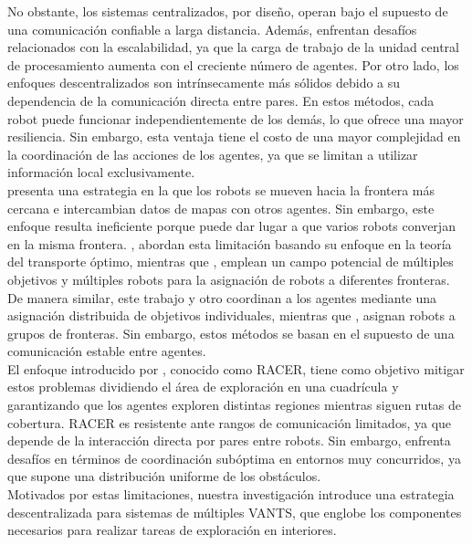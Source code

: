 \documentclass[sigconf]{acmart}
\begin{document}
No obstante, los sistemas centralizados, por diseño, operan bajo el supuesto de una comunicación confiable a larga distancia. Además, enfrentan desafíos relacionados con la escalabilidad, ya que la carga de trabajo de la unidad central de procesamiento aumenta con el creciente número de agentes. Por otro lado, los enfoques descentralizados son intrínsecamente más sólidos debido a su dependencia de la comunicación directa entre pares. En estos métodos, cada robot puede funcionar independientemente de los demás, lo que ofrece una mayor resiliencia. Sin embargo, esta ventaja tiene el costo de una mayor complejidad en la coordinación de las acciones de los agentes, ya que se limitan a utilizar información local exclusivamente.\\

\citeauthor{YAMAUCHI1997} \cite{YAMAUCHI1997} presenta una estrategia en la que los robots se mueven hacia la frontera más cercana e intercambian datos de mapas con otros agentes. Sin embargo, este enfoque resulta ineficiente porque puede dar lugar a que varios robots converjan en la misma frontera. \citeauthor{9483227} \cite{9483227}, abordan esta limitación basando su enfoque en la teoría del transporte óptimo, mientras que \citeauthor{9561328} \cite{9561328}, emplean un campo potencial de múltiples objetivos y múltiples robots para la asignación de robots a diferentes fronteras. De manera similar, este trabajo y otro coordinan a los agentes mediante una asignación distribuida de objetivos individuales, mientras que \citeauthor{9561226} \cite{9561226}, asignan robots a grupos de fronteras. Sin embargo, estos métodos se basan en el supuesto de una comunicación estable entre agentes.\\

El enfoque introducido por \citeauthor{RACER2022} \cite{RACER2022}, conocido como RACER, tiene como objetivo mitigar estos problemas dividiendo el área de exploración en una cuadrícula y garantizando que los agentes exploren distintas regiones mientras siguen rutas de cobertura. RACER es resistente ante rangos de comunicación limitados, ya que depende de la interacción directa por pares entre robots. Sin embargo, enfrenta desafíos en términos de coordinación subóptima en entornos muy concurridos, ya que supone una distribución uniforme de los obstáculos.\\

Motivados por estas limitaciones, nuestra investigación introduce una estrategia descentralizada para sistemas de múltiples VANTS, que englobe los componentes necesarios para realizar tareas de exploración en interiores.
\end{document}
